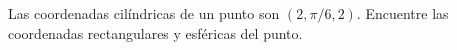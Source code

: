 \item Las coordenadas cilíndricas de un punto son $(2, \pi/6, 2)$. Encuentre las coordenadas rectangulares y esféricas del punto.
